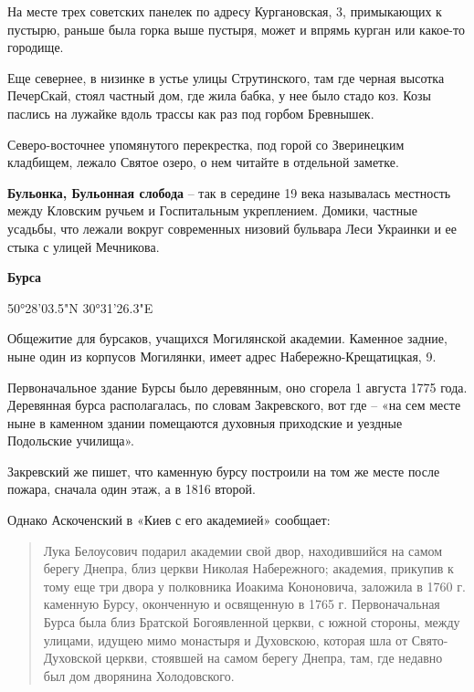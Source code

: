 На месте трех советских панелек по адресу Кургановская, 3, примыкающих к пустырю, раньше была горка выше пустыря, может и впрямь курган или какое-то городище.

Еще севернее, в низинке в устье улицы Струтинского, там где черная высотка ПечерСкай, стоял частный дом, где жила бабка, у нее было стадо коз. Козы паслись на лужайке вдоль трассы как раз под горбом Бревнышек.

Северо-восточнее упомянутого перекрестка, под горой со Зверинецким кладбищем, лежало Святое озеро, о нем читайте в отдельной заметке.\\

\medskip

\textbf{Бульонка, Бульонная слобода} – так в середине 19 века называлась местность между Кловским ручьем и Госпитальным укреплением. Домики, частные усадьбы, что лежали вокруг современных низовий бульвара Леси Украинки и ее стыка с улицей Мечникова.\\

\medskip

\textbf{Бурса} 

50°28'03.5"N 30°31'26.3"E

Общежитие для бурсаков, учащихся Могилянской академии. Каменное задние, ныне один из корпусов Могилянки, имеет адрес Набережно-Крещатицкая, 9. 

Первоначальное здание Бурсы было деревянным, оно сгорела 1 августа 1775 года. Деревянная бурса располагалась, по словам Закревского, вот где – «на сем месте ныне в каменном здании помещаются духовныя приходские и уездные Подольские училища». 

Закревский же пишет, что каменную бурсу построили на том же месте после пожара, сначала один этаж, а в 1816 второй.

Однако Аскоченский в «Киев с его академией» сообщает:

\begin{quotation}
Лука Белоусович подарил академии свой двор, находившийся на самом берегу Днепра, близ церкви Николая Набережного; академия, прикупив к тому еще три двора у полковника Иоакима Кононовича, заложила в 1760 г. каменную Бурсу, оконченную и освященную в 1765 г. Первоначальная Бурса была близ Братской Богоявленной церкви, с южной стороны, между улицами, идущею мимо монастыря и Духовскою, которая шла от Свято-Духовской церкви, стоявшей на самом берегу Днепра, там, где недавно был дом дворянина Холодовского.
\end{quotation}

